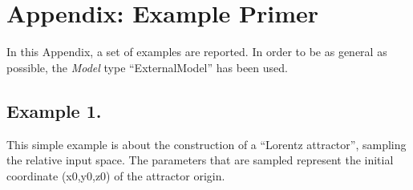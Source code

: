 \appendix
\section{Appendix: Example Primer \\ \vspace{2 mm} {\small }}
\label{sec:examplePrimer}
In this Appendix, a set of examples are reported. In order to be as general as possible, the \textit{Model} type ``ExternalModel'' has been used.
\subsection{Example 1.}
\label{subsec:ex1}
This simple example is about the construction of a ``Lorentz attractor'', sampling the relative input space. The parameters that are sampled represent the initial coordinate (x0,y0,z0) of the attractor origin. 

